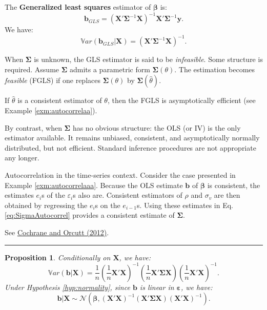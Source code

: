 \documentclass[
]{book}
\newtheorem{proposition}{Proposition}[chapter]
\theoremstyle{definition}
\theoremstyle{definition}
\theoremstyle{definition}
\theoremstyle{definition}
\theoremstyle{remark}
\begin{document}
The \textbf{Generalized least squares} estimator of \(\boldsymbol\beta\) is:
\begin{equation}
\boxed{\mathbf{b}_{GLS} = (\mathbf{X}'\boldsymbol\Sigma^{-1}\mathbf{X})^{-1}\mathbf{X}'\boldsymbol\Sigma^{-1}\mathbf{y}}.\label{eq:betaGLS}
\end{equation}
We have:
\[
\mathbb{V}ar(\mathbf{b}_{GLS}|\mathbf{X}) = (\mathbf{X}'\boldsymbol\Sigma^{-1}\mathbf{X})^{-1}.
\]

When \(\boldsymbol\Sigma\) is unknown, the GLS estimator is said to be \emph{infeasible}. Some structure is required. Assume \(\boldsymbol\Sigma\) admits a parametric form \(\boldsymbol\Sigma(\theta)\). The estimation becomes \emph{feasible} (FGLS) if one replaces \(\boldsymbol\Sigma(\theta)\) by \(\boldsymbol\Sigma(\hat\theta)\).

If \(\hat\theta\) is a consistent estimator of \(\theta\), then the FGLS is asymptotically efficient (see Example \ref{exm:autocorrelaa}).

By contrast, when \(\boldsymbol\Sigma\) has no obvious structure: the OLS (or IV) is the only estimator available. It remains unbiased, consistent, and asymptotically normally distributed, but not efficient. Standard inference procedures are not appropriate any longer.

Autocorrelation in the time-series context. Consider the case presented in Example \ref{exm:autocorrelaaa}. Because the OLS estimate \(\mathbf{b}\) of \(\boldsymbol\beta\) is consistent, the estimates \(e_i\)s of the \(\varepsilon_i\)s also are. Consistent estimators of \(\rho\) and \(\sigma_v\) are then obtained by regressing the \(e_i\)s on the \(e_{i-1}\)s. Using these estimates in Eq. \eqref{eq:SigmaAutocorrel} provides a consistent estimate of \(\boldsymbol\Sigma\).

See \href{https://www.tandfonline.com/doi/abs/10.1080/01621459.1949.10483290}{Cochrane and Orcutt (2012)}.

\begin{center}\rule{0.5\linewidth}{0.5pt}\end{center}

\begin{proposition}
\protect\hypertarget{prp:AsymptOLSGRM}{}\label{prp:AsymptOLSGRM}Conditionally on \(\mathbf{X}\), we have:
\begin{equation}
\mathbb{V}ar(\mathbf{b}|\mathbf{X}) = \frac{1}{n}\left(\frac{1}{n}\mathbf{X}'\mathbf{X}\right)^{-1}\left(\frac{1}{n}\mathbf{X}'\boldsymbol\Sigma\mathbf{X}\right)\left(\frac{1}{n}\mathbf{X}'\mathbf{X}\right)^{-1}.\label{eq:xsx}
\end{equation}
Under Hypothesis \ref{hyp:normality}, since \(\mathbf{b}\) is linear in \(\boldsymbol\varepsilon\), we have:
\begin{equation}
\mathbf{b}|\mathbf{X} \sim \mathcal{N}\left(\boldsymbol\beta,\left(\mathbf{X}'\mathbf{X}\right)^{-1}\left(\mathbf{X}'\boldsymbol\Sigma\mathbf{X}\right)\left(\mathbf{X}'\mathbf{X}\right)^{-1}\right).
\end{equation}
\end{proposition}
\end{document}

